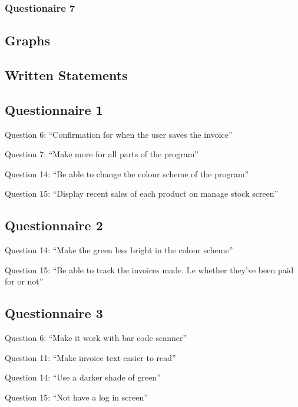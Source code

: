 \label{Questionnaire7}
\subsubsection{Questionaire 7}





\pagebreak
\subsection{Graphs}

\pagebreak
\subsection{Written Statements}

\subsection{Questionnaire 1}

Question 6: ``Confirmation for when the user saves the invoice''

Question 7: ``Make more for all parts of the program''

Question 14: ``Be able to change the colour scheme of the program''

Question 15: ``Display recent sales of each product on manage stock screen''

\subsection{Questionnaire 2}

Question 14: ``Make the green less bright in the colour scheme''

Question 15: ``Be able to track the invoices made. I.e whether they've been paid for or not''

\subsection{Questionnaire 3}

Question 6: ``Make it work with bar code scanner''

Question 11: ``Make invoice text easier to read''

Question 14: ``Use a darker shade of green''

Question 15: ``Not have a log in screen''

